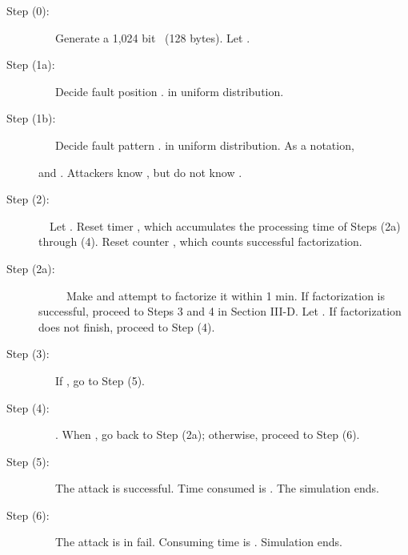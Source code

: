\documentclass{article}
\begin{document}
\begin{description}
\item[Step (0):] ~~~Generate a 1,024 bit ~(128 bytes). Let . 
\item[Step (1a):] ~~~Decide fault position .   in uniform distribution. 
\item[Step (1b):] ~~~Decide fault pattern .  in uniform distribution.
As a notation, 

and .
Attackers know , but do not know .
\item[Step (2):] ~~Let . 
Reset timer , which accumulates the processing time of Steps (2a) through (4).
Reset counter , which counts successful factorization.
\item[Step (2a):] ~~~~~Make  and attempt to factorize it within 1 min. 
If factorization is successful, proceed to Steps 3 and 4 in Section III-D. Let .
If factorization does not finish, proceed to Step (4).
\item[Step (3):] ~~~If , go to Step (5).
\item[Step (4):] ~~~.
When , go back to Step (2a); otherwise, proceed to Step (6).
\item[Step (5):] ~~~The attack is successful. Time consumed is . 
The simulation ends.
\item[Step (6):] ~~~The attack is in fail. Consuming time is . Simulation ends.
\end{description}
\end{document}
